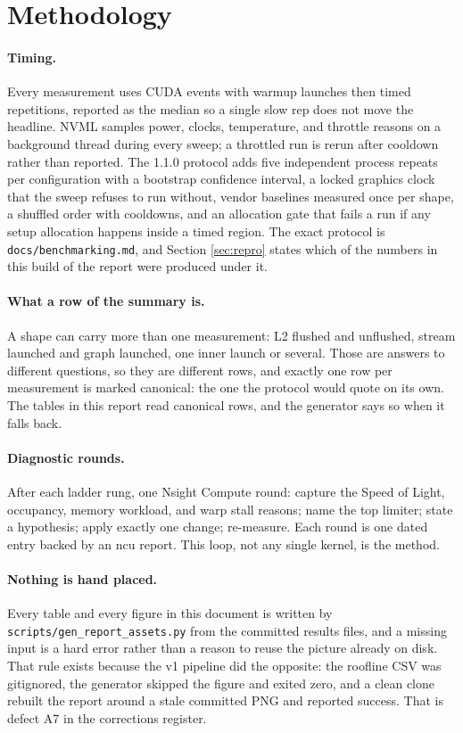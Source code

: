 \section{Methodology}
\label{sec:method}

\paragraph{Timing.} Every measurement uses CUDA events with warmup launches then
timed repetitions, reported as the median so a single slow rep does not move the
headline. NVML samples power, clocks, temperature, and throttle reasons on a
background thread during every sweep; a throttled run is rerun after cooldown
rather than reported. The 1.1.0 protocol adds five independent process repeats per
configuration with a bootstrap confidence interval, a locked graphics clock that
the sweep refuses to run without, vendor baselines measured once per shape, a
shuffled order with cooldowns, and an allocation gate that fails a run if any
setup allocation happens inside a timed region. The exact protocol is
\texttt{docs/benchmarking.md}, and Section \ref{sec:repro} states which of the
numbers in this build of the report were produced under it.

\paragraph{What a row of the summary is.} A shape can carry more than one
measurement: L2 flushed and unflushed, stream launched and graph launched, one
inner launch or several. Those are answers to different questions, so they are
different rows, and exactly one row per measurement is marked canonical: the one
the protocol would quote on its own. The tables in this report read canonical
rows, and the generator says so when it falls back.

\paragraph{Diagnostic rounds.} After each ladder rung, one Nsight Compute round:
capture the Speed of Light, occupancy, memory workload, and warp stall reasons;
name the top limiter; state a hypothesis; apply exactly one change; re-measure.
Each round is one dated entry backed by an ncu report. This loop, not any single
kernel, is the method.

\paragraph{Nothing is hand placed.} Every table and every figure in this document
is written by \texttt{scripts/gen\_report\_assets.py} from the committed results
files, and a missing input is a hard error rather than a reason to reuse the
picture already on disk. That rule exists because the v1 pipeline did the
opposite: the roofline CSV was gitignored, the generator skipped the figure and
exited zero, and a clean clone rebuilt the report around a stale committed PNG and
reported success. That is defect A7 in the corrections register.
